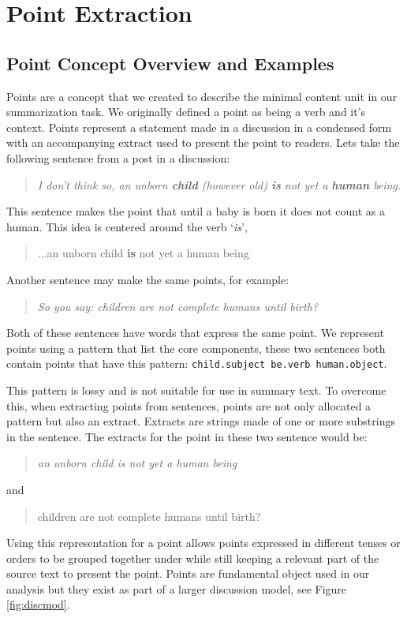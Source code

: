 \chapter{Point Extraction\label{chap:point-extraction}}
  \section{Point Concept Overview and Examples}
    Points are a concept that we created to describe the minimal content unit in our summarization task. We originally defined a point as being a verb and it's context. Points represent a statement made in a discussion in a condensed form with an accompanying extract used to present the point to readers. Lets take the following sentence from a post in a discussion:

    \medskip
    \begin{center}
      \blockquote{\textit{I don't think so, an unborn \textbf{child} (however old) \textbf{is} not yet a \textbf{human} being.}}
    \end{center}
    \medskip

    This sentence makes the point that until a baby is born it does not count as a human. This idea is centered around the verb `\textit{is}', \blockquote{...an unborn child \textbf{is} not yet a human being}. Another sentence may make the same points, for example: \blockquote{\textit{So you say: children are not complete humans until birth?}}. Both of these sentences have words that express the same point. We represent points using a pattern that list the core components, these two sentences both contain points that have this pattern: \texttt{child.subject be.verb human.object}.

   This pattern is lossy and is not suitable for use in summary text. To overcome this, when extracting points from sentences, points are not only allocated a pattern but also an extract. Extracts are strings made of one or more substrings in the sentence. The extracts for the point in these two sentence would be:

    \medskip
    \begin{center}
      \blockquote{\textit{an unborn child is not yet a human being}} and \blockquote{children are not complete humans until birth?}
    \end{center}
    \medskip

    Using this representation for a point allows points expressed in different tenses or orders to be grouped together under while still keeping a relevant part of the source text to present the point. Points are fundamental object used in our analysis but they exist as part of a larger discussion model, see Figure \ref{fig:discmod}.

